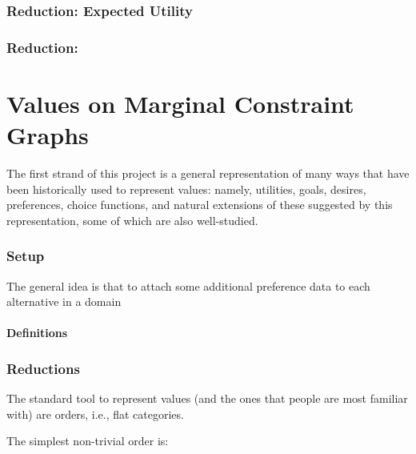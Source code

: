 \documentclass{article}
\begin{document}
	\section{Reduction: Expected Utility}
	\section{Reduction: }

	\part{Values on Marginal Constraint Graphs}
	
	The first strand of this project is a general representation of many ways that have been historically used to represent values: namely, utilities, goals, desires, preferences, choice functions, and natural extensions of these suggested by this representation, some of which are also well-studied. 
	
	\section{Setup}
	
	
	The general idea is that to attach some additional preference data to each alternative in a domain
	
	\subsection{Definitions}
	

	
	\section{Reductions}
	
	The standard tool to represent values (and the ones that people are most familiar with) are orders, i.e., flat categories. 
	
	The simplest non-trivial order is:
	\begin{center}
		\raisebox{0.7em}{$\mathbb B = $}~
	\end{center}
	
\end{document}
